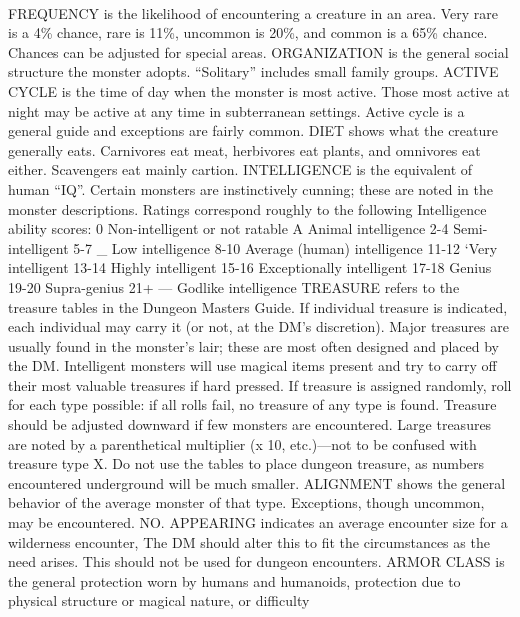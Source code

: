 \documentclass[../tsr2102.tex]{subfiles}
\begin{document}
\\
FREQUENCY is the likelihood of encountering a creature in an area. Very
rare is a 4\% chance, rare is 11\%, uncommon is 20\%, and common is a
65\% chance. Chances can be adjusted for special areas.
ORGANIZATION is the general social structure the monster adopts.
“Solitary” includes small family groups.
ACTIVE CYCLE is the time of day when the monster is most active. Those
most active at night may be active at any time in subterranean settings.
Active cycle is a general guide and exceptions are fairly common.
DIET shows what the creature generally eats. Carnivores eat meat, herbivores eat plants, and omnivores eat either. Scavengers eat mainly cartion.
INTELLIGENCE is the equivalent of human “IQ”. Certain monsters are
instinctively cunning; these are noted in the monster descriptions. Ratings
correspond roughly to the following Intelligence ability scores:
0 Non-intelligent or not ratable
A Animal intelligence
2-4 Semi-intelligent
5-7 _ Low intelligence
8-10 Average (human) intelligence
11-12 ‘Very intelligent
13-14 Highly intelligent
15-16 Exceptionally intelligent
17-18 Genius
19-20 Supra-genius
21+ — Godlike intelligence
TREASURE refers to the treasure tables in the Dungeon Masters Guide. If
individual treasure is indicated, each individual may carry it (or not, at
the DM's discretion). Major treasures are usually found in the monster's
lair; these are most often designed and placed by the DM. Intelligent monsters will use magical items present and try to carry off their most valuable
treasures if hard pressed. If treasure is assigned randomly, roll for each
type possible: if all rolls fail, no treasure of any type is found. Treasure
should be adjusted downward if few monsters are encountered. Large
treasures are noted by a parenthetical multiplier (x 10, etc.)—not to be
confused with treasure type X. Do not use the tables to place dungeon
treasure, as numbers encountered underground will be much smaller.
ALIGNMENT shows the general behavior of the average monster of that
type. Exceptions, though uncommon, may be encountered.
NO. APPEARING indicates an average encounter size for a wilderness
encounter, The DM should alter this to fit the circumstances as the need
arises. This should not be used for dungeon encounters.
ARMOR CLASS is the general protection worn by humans and humanoids, protection due to physical structure or magical nature, or difficulty
\end{document}
